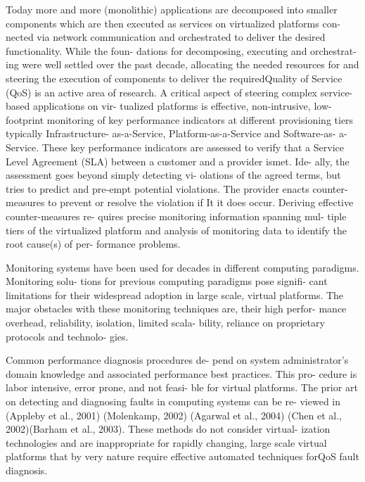 Today more and more (monolithic) applications are decomposed into smaller components which are then executed as services on virtualized platforms con- nected via network communication and orchestrated to deliver the desired functionality. While the foun- dations for decomposing, executing and orchestrat- ing were well settled over the past decade, allocating the needed resources for and steering the execution of components to deliver the requiredQuality of Service (QoS) is an active area of research. A critical aspect of steering complex service-based applications on vir- tualized platforms is effective, non-intrusive, low- footprint monitoring of key performance indicators at different provisioning tiers typically Infrastructure- as-a-Service, Platform-as-a-Service and Software-as- a-Service. These key performance indicators are assessed to verify that a Service Level Agreement (SLA) between a customer and a provider ismet. Ide- ally, the assessment goes beyond simply detecting vi- olations of the agreed terms, but tries to predict and pre-empt potential violations. The provider enacts counter-measures to prevent or resolve the violation if
It it does occur. Deriving effective counter-measures re- quires precise monitoring information spanning mul- tiple tiers of the virtualized platform and analysis of monitoring data to identify the root cause(s) of per- formance problems.

Monitoring systems have been used for decades
in different computing paradigms. Monitoring solu- tions for previous computing paradigms pose signifi- cant limitations for their widespread adoption in large scale, virtual platforms. The major obstacles with these monitoring techniques are, their high perfor- mance overhead, reliability, isolation, limited scala- bility, reliance on proprietary protocols and technolo- gies.

Common performance diagnosis procedures de-
pend on system administrator’s domain knowledge and associated performance best practices. This pro- cedure is labor intensive, error prone, and not feasi- ble for virtual platforms. The prior art on detecting and diagnosing faults in computing systems can be re- viewed in (Appleby et al., 2001) (Molenkamp, 2002) (Agarwal et al., 2004) (Chen et al., 2002)(Barham et al., 2003). These methods do not consider virtual- ization technologies and are inappropriate for rapidly changing, large scale virtual platforms that by very nature require effective automated techniques forQoS fault diagnosis.

